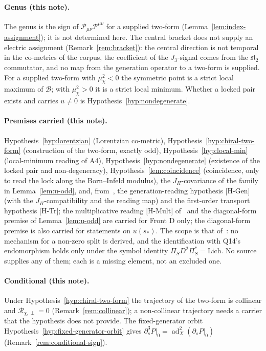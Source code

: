 \documentclass[11pt]{article}
\theoremstyle{definition}
\theoremstyle{remark}
\newcommand{\JPi}{J_{\Pi}}
\newcommand{\Jthree}{J_{3}}
\newcommand{\Pchi}{\mathcal{P}}
\newcommand{\Bsat}{\mathcal{B}}
\newcommand{\muchi}{\mu_{\chi}^{2}}
\begin{document}
    \paragraph{Genus (this note).}
      The genus is the sign of $\Pchi_{\mu\nu}\Pchi^{\mu\nu}$ for a supplied two-form
      (Lemma~\ref{lem:index-assignment}); it is not determined here.
      The central bracket does not supply an electric assignment (Remark~\ref{rem:bracket}): the central direction is
      not temporal in the co-metrics of the corpus, the coefficient of the $\Jthree$-signal comes from the
      $\mathfrak{sl}_2$ commutator, and no map from the generation operator to a two-form is supplied.
      For a supplied two-form with $\muchi<0$ the symmetric point is a strict local maximum of $\Bsat$; with
      $\muchi>0$ it is a strict local minimum.
      Whether a locked pair exists and carries $u\neq0$ is Hypothesis~\ref{hyp:nondegenerate}.

    \paragraph{Premises carried (this note).}
      Hypothesis~\ref{hyp:lorentzian} (Lorentzian co-metric), Hypothesis~\ref{hyp:chiral-two-form} (construction of the
      two-form, exactly odd), Hypothesis~\ref{hyp:local-min} (local-minimum reading of A4),
      Hypothesis~\ref{hyp:nondegenerate} (existence of the locked pair and non-degeneracy),
      Hypothesis~\ref{lem:coincidence} (coincidence, only to read the lock along the Born--Infeld modulus),
      the $\JPi$-covariance of the family in Lemma~\ref{lem:u-odd}, and, from~\cite{Beau2026prs}, the
      generation-reading hypothesis [H-Gen] (with the $\JPi$-compatibility and the reading map) and the first-order
      transport hypothesis [H-Tr]; the multiplicative reading [H-Mult] of~\cite{Beau2026prs} and the diagonal-form premise
      of Lemma~\ref{lem:u-odd} are carried for Front D only; the diagonal-form premise is also carried for statements on $u(s_*)$.
      The scope is that of~\cite{Beau2026prs}: no mechanism for a non-zero split is derived, and the identification with
      Q14's endomorphism holds only under the symbol identity $\Pi_SD^2\Pi_S^*=\mathrm{Lich}$.
      No source supplies any of them; each is a missing element, not an excluded one.

    \paragraph{Conditional (this note).}
      Under Hypothesis~\ref{hyp:chiral-two-form} the trajectory of the two-form is collinear and $\mathcal
      R_{\chi,\perp}=0$
      (Remark~\ref{rem:collinear}); a non-collinear trajectory needs a carrier that the hypothesis does not provide.
      The fixed-generator orbit Hypothesis~\ref{hyp:fixed-generator-orbit} gives $\partial_s^3P|_0=\operatorname{ad}_X^2
      (\partial_sP|_0)$ (Remark~\ref{rem:conditional-sign}).
\end{document}
